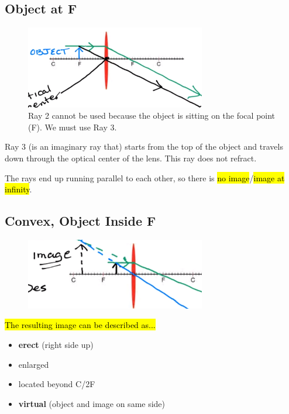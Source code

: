 \documentclass[a4paper,12pt]{article}
\begin{document}
\subsection{Object at F}
\begin{figure}[H]
    \centering
    \includegraphics[width=0.7\textwidth]{convex-atf}
    \caption{Ray 2 cannot be used because the object is sitting on the focal point (F). We must use Ray 3.}
\end{figure}

Ray 3 (is an imaginary ray that) starts from the top of the object and travels down through the optical center of the lens. This ray does not refract.

The rays end up running parallel to each other, so there is \hl{no image}/\hl{image at infinity}.

\subsection{Convex, Object Inside F}
\begin{figure}[H]
    \centering
    \includegraphics[width=0.7\textwidth]{convex-bf}
\end{figure}

\hl{The resulting image can be described as...}
\begin{itemize}
    \item{\textbf{erect} (right side up)}
    \item{enlarged}
    \item{located beyond C/2F}
    \item{\textbf{virtual} (object and image on same side)}
\end{itemize}
\end{document}
